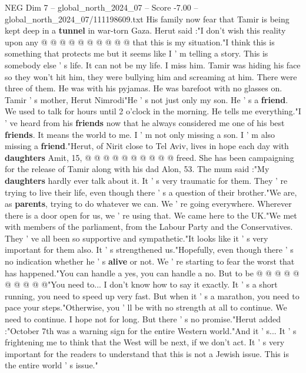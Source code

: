 \begin{textsample}{NEG Dim 7 – global\_north\_2024\_07 – Score -7.00 – global\_north\_2024\_07/111198609.txt}
His family now fear that Tamir is being kept deep in a \textbf{tunnel} in war-torn Gaza.
Herut said :"I don't wish this reality upon any @ @ @ @ @ @ @ @ @ @ that this is my situation."I think this is something that protects me but it seems like I ' m telling a story.
This is somebody else ' s life.
It can not be my life.
I miss him.
Tamir was hiding his face so they won't hit him, they were bullying him and screaming at him.
There were three of them.
He was with his pyjamas.
He was barefoot with no glasses on.
Tamir ' s mother, Herut Nimrodi"He ' s not just only my son.
He ' s a \textbf{friend}.
We used to talk for hours until 2 o'clock in the morning.
He tells me everything."I ' ve heard from his \textbf{friends} now that he always considered me one of his best \textbf{friends}.
It means the world to me.
I ' m not only missing a son.
I ' m also missing a \textbf{friend}."Herut, of Nirit close to Tel Aviv, lives in hope each day with \textbf{daughters} Amit, 15, @ @ @ @ @ @ @ @ @ @ freed.
She has been campaigning for the release of Tamir along with his dad Alon, 53.
The mum said :"My \textbf{daughters} hardly ever talk about it.
It ' s very traumatic for them.
They ' re trying to live their life, even though there ' s a question of their brother."We are, as \textbf{parents}, trying to do whatever we can.
We ' re going everywhere.
Wherever there is a door open for us, we ' re using that.
We came here to the UK."We met with members of the parliament, from the Labour Party and the Conservatives.
They ' ve all been so supportive and sympathetic."It looks like it ' s very important for them also.
It ' s strengthened us."Hopefully, even though there ' s no indication whether he ' s \textbf{alive} or not.
We ' re starting to fear the worst that has happened."You can handle a yes, you can handle a no.
But to be @ @ @ @ @ @ @ @ @ @"You need to...
I don't know how to say it exactly.
It ' s a short running, you need to speed up very fast.
But when it ' s a marathon, you need to pace your steps."Otherwise, you ' ll be with no strength at all to continue.
We need to continue.
I hope not for long.
But there ' s no promise."Herut added :"October 7th was a warning sign for the entire Western world."And it ' s...
It ' s frightening me to think that the West will be next, if we don't act.
It ' s very important for the readers to understand that this is not a Jewish issue.
This is the entire world ' s issue."

\end{textsample}
